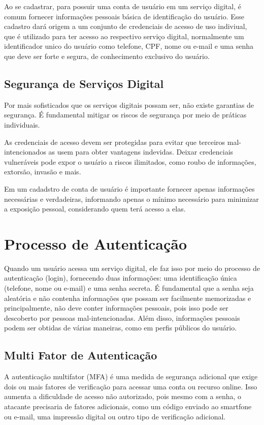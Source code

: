 \documentclass[12pt]{article}
\begin{document}
Ao se cadastrar, para possuir uma conta de usuário em um serviço digital,
é comum fornecer informações pessoais básica de identificação do usuário.
Esse cadastro dará origem a um conjunto de credenciais de acesso de uso
indiviual, que é utilizado para ter acesso ao respectivo serviço digital,
normalmente um identificador unico do usuário como telefone, CPF, nome ou
e-mail e uma senha que deve ser forte e segura, de conhecimento exclusivo
do usuário.

\subsection{Segurança de Serviços Digital}

Por mais sofisticados que os serviços digitais possam ser, não existe
garantias de segurança. É fundamental mitigar os riscos de segurança
por meio de práticas individuais.

As credenciais de acesso devem ser protegidas para evitar que terceiros
mal-intencionados as usem para obter vantagens indevidas.
Deixar credenciais vulneráveis pode expor o usuário a riscos ilimitados,
como roubo de informações, extorsão, invasão e mais.

Em um cadadstro de conta de usuário é importante fornecer apenas informações
necessárias e verdadeiras, informando apenas o mínimo necessário para
minimizar a exposição pessoal, considerando quem terá acesso a elas.

\section{Processo de Autenticação}

Quando um usuário acessa um serviço digital, ele faz isso por meio do
processo de autenticação (login), fornecendo duas informações: uma
identificação única (telefone, nome ou e-mail) e uma senha secreta.
É fundamental que a senha seja aleatória e não contenha informações
que possam ser facilmente memorizadas e principalmente, não deve conter
informações pessoais, pois isso pode ser descoberto por pessoas
mal-intencionadas.
Além disso, informações pessoais podem ser obtidas de várias maneiras,
como em perfis públicos do usuário.

\subsection{Multi Fator de Autenticação}

A autenticação multifator (MFA) é uma medida de segurança adicional que
exige dois ou mais fatores de verificação para acessar uma conta ou
recurso online.
Isso aumenta a dificuldade de acesso não autorizado, pois mesmo com a
senha, o atacante precisaria de fatores adicionais, como um código
enviado ao smartfone ou e-mail, uma impressão digital ou outro tipo de
verificação adicional.
\end{document}
